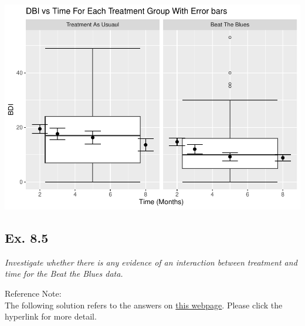 \documentclass[
]{article}
\begin{document}
\includegraphics{HUDM6122-Homework_10-Chenguang-Pan_files/figure-latex/unnamed-chunk-9-1.pdf}

\hypertarget{ex.-8.5}{%
\subsection{Ex. 8.5}\label{ex.-8.5}}

\emph{Investigate whether there is any evidence of an interaction
between treatment and time for the Beat the Blues data.}

Reference Note:\\
The following solution refers to the answers on
\href{https://rstudio-pubs-static.s3.amazonaws.com/529736_55aeb8cb60a44adf948c1457e6a00262.html}{this
webpage}. Please click the hyperlink for more detail.
\end{document}
